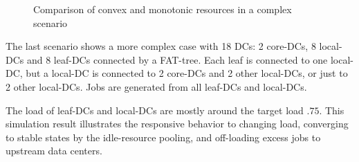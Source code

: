 \begin{figure}[tb]
  \caption{Comparison of convex and monotonic resources in a complex scenario}

  \label{fig:figures}
  \end{figure}

The last scenario shows a more complex case with 18 DCs: 2 core-DCs, 8
local-DCs and 8 leaf-DCs connected by a FAT-tree.  Each leaf is
connected to one local-DC, but a local-DC is connected to 2 core-DCs
and 2 other local-DCs, or just to 2 other local-DCs.
Jobs are generated from all leaf-DCs and local-DCs.

The load of leaf-DCs and local-DCs are mostly around the target load
$.75$.
This simulation result illustrates
the responsive behavior to changing load,
converging to stable states by the idle-resource pooling,
and off-loading excess jobs to upstream data centers.

